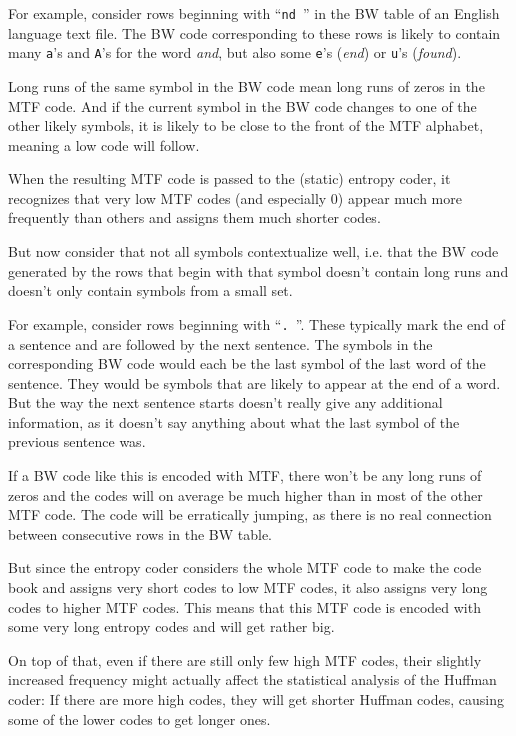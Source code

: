 \documentclass[a4paper]{scrreprt}
\begin{document}
For example, consider rows beginning with ``\texttt{nd }'' in the BW table of an
English language text file. The BW code corresponding to these rows is likely to
contain many \texttt{a}'s and \texttt{A}'s for the word \emph{and}, but also
some \texttt{e}'s (\emph{end}) or \texttt{u}'s (\emph{found}).

Long runs of the same symbol in the BW code mean long runs of zeros in the MTF
code. And if the current symbol in the BW code changes to one of the other
likely symbols, it is likely to be close to the front of the MTF alphabet,
meaning a low code will follow.

When the resulting MTF code is passed to the (static) entropy coder, it
recognizes that very low MTF codes (and especially 0) appear much more
frequently than others and assigns them much shorter codes.

But now consider that not all symbols contextualize well, i.e. that the BW code
generated by the rows that begin with that symbol doesn't contain long runs and
doesn't only contain symbols from a small set.

For example, consider rows beginning with ``\texttt{. }''. These typically mark
the end of a sentence and are followed by the next sentence. The symbols in the
corresponding BW code would each be the last symbol of the last word of the
sentence. They would be symbols that are likely to appear at the end of a
word. But the way the next sentence starts doesn't really give any additional
information, as it doesn't say anything about what the last symbol of the
previous sentence was.

If a BW code like this is encoded with MTF, there won't be any long runs of
zeros and the codes will on average be much higher than in most of the other MTF
code. The code will be erratically jumping, as there is no real connection
between consecutive rows in the BW table.

But since the entropy coder considers the whole MTF code to make the code
book and assigns very short codes to low MTF codes, it also assigns very long
codes to higher MTF codes. This means that this MTF code is encoded with some
very long entropy codes and will get rather big.

On top of that, even if there are still only few high MTF codes, their slightly
increased frequency might actually affect the statistical analysis of the
Huffman coder: If there are more high codes, they will get shorter Huffman
codes, causing some of the lower codes to get longer ones.
\end{document}
